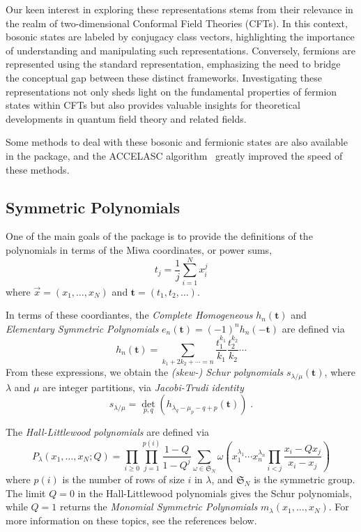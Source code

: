 \documentclass[a4paper,10pt]{amsart}
\begin{document}
Our keen interest in exploring these representations stems
from their relevance in the realm of two-dimensional Conformal Field
Theories (CFTs). In this context, bosonic states are labeled by
conjugacy class vectors, highlighting the importance of
understanding and manipulating such representations. Conversely,
fermions are represented using the standard representation,
emphasizing the need to bridge the conceptual gap between these
distinct frameworks. Investigating these representations not only
sheds light on the fundamental properties of fermion states within
CFTs but also provides valuable insights for theoretical developments
in quantum field theory and related fields.

Some methods to deal with these bosonic and fermionic states are
also available in the package, and the \textrm{ACCELASC}
algorithm~\cite{Kelleher:2009} greatly improved the
speed of these methods.

\subsection{Symmetric Polynomials}

One of the main goals of the package is to provide the definitions of the 
polynomials in terms of the Miwa coordinates, or power sums, 
$$ t_j = \frac{1}{j} \sum_{i=1}^N x_i^j $$ where $\vec{x} = 
(x_1, \dots, x_N)$ and $\mathbf{t} = (t_1, t_2, \dots)$.

In terms of these coordiantes, the \emph{Complete Homogeneous} $h_n(\mathbf{t})$ 
and \emph{Elementary Symmetric Polynomials} $e_n(\mathbf{t}) = 
(-1)^n h_n(-\mathbf{t})$ are defined via 
$$ h_n(\mathbf{t}) = \sum_{k_1 + 2k_2+ \cdots = n} 
\frac{t_1^{k_1}}{k_1}\frac{t_2^{k_2}}{k_2} \cdots $$
From these expressions, we obtain the \emph{(skew-) Schur polynomials}
$s_{\lambda/\mu}(\mathbf{t})$, where 
$\lambda$ and $\mu$ are integer partitions, via \emph{Jacobi-Trudi identity}
$$ s_{\lambda/\mu} = \det_{p,q}(h_{\lambda_q - \mu_p - q + p}(\mathbf{t})) \; . $$

The \emph{Hall-Littlewood polynomials} are defined via
$$
P_{\lambda}(x_1, \dots, x_N; Q) = \prod_{i\geq 0} \prod_{j=1}^{p(i)}
\frac{1-Q}{1-Q^j} \sum_{\omega \in \mathfrak{S}_N} \omega\left(
x_1^{\lambda_1}\cdots x_n^{\lambda_n} \prod_{i<j} \frac{x_i - Q
  x_j}{x_i - x_j} \right)
$$
where $p(i)$ is the number of rows of size $i$ in $\lambda$, and
$\mathfrak{S}_N$ is the symmetric group. The limit $Q=0$ in the
Hall-Littlewood polynomials gives the Schur polynomials, while $Q=1$
returns the \emph{Monomial Symmetric Polynomials} $m_\lambda(x_1,
\dots, x_N)$. For more information on these topics, see the references
below.
\end{document}
